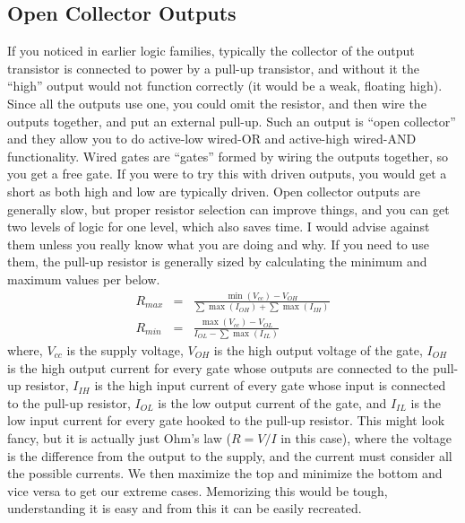 \subsection{Open Collector Outputs}
If you noticed in earlier logic families, typically the collector of the output transistor is connected to power by a pull-up transistor, and without it the ``high'' output would not function correctly (it would be a weak, floating high).  Since all the outputs use one, you could omit the resistor, and then wire the outputs together, and put an external pull-up.  Such an output is ``open collector'' and they allow you to do active-low wired-OR and active-high wired-AND functionality.  Wired gates are ``gates'' formed by wiring the outputs together, so you get a free gate.  If you were to try this with driven outputs, you would get a short as both high and low are typically driven.  Open collector outputs are generally slow, but proper resistor selection can improve things, and you can get two levels of logic for one level, which also saves time.  I would advise against them unless you really know what you are doing and why.  If you need to use them, the pull-up resistor is generally sized by calculating the minimum and maximum values per below.
\begin{eqnarray}
R_{max} &=& \frac{\min{(V_{cc})}-V_{OH}}{\sum{\max{(I_{OH})}}+\sum{\max{(I_{IH})}}}\\
R_{min} &=& \frac{\max{(V_{cc})}-V_{OL}}{I_{OL}-\sum{\max{(I_{IL})}}}
\end{eqnarray}
where, $V_{cc}$ is the supply voltage, $V_{OH}$ is the high output voltage of the gate, $I_{OH}$ is the high output current for every gate whose outputs are connected to the pull-up resistor, $I_{IH}$ is the high input current of every gate whose input is connected to the pull-up resistor, $I_{OL}$ is the low output current of the gate, and $I_{IL}$ is the low input current for every gate hooked to the pull-up resistor.  This might look fancy, but it is actually just Ohm's law ($R=V/I$ in this case), where the voltage is the difference from the output to the supply, and the current must consider all the possible currents.  We then maximize the top and minimize the bottom and vice versa to get our extreme cases.  Memorizing this would be tough, understanding it is easy and from this it can be easily recreated.


